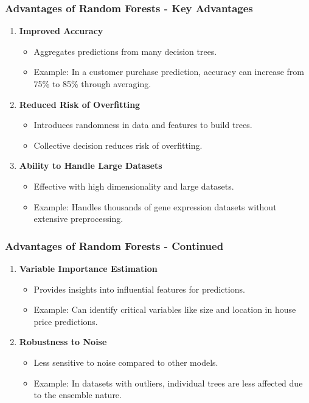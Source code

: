 \documentclass[aspectratio=169]{beamer}
\begin{document}
\begin{frame}[fragile]
    \frametitle{Advantages of Random Forests - Key Advantages}
    \begin{enumerate}
        \item \textbf{Improved Accuracy}
        \begin{itemize}
            \item Aggregates predictions from many decision trees.
            \item Example: In a customer purchase prediction, accuracy can increase from 75\% to 85\% through averaging.
        \end{itemize}
        
        \item \textbf{Reduced Risk of Overfitting}
        \begin{itemize}
            \item Introduces randomness in data and features to build trees.
            \item Collective decision reduces risk of overfitting.
        \end{itemize}
        
        \item \textbf{Ability to Handle Large Datasets}
        \begin{itemize}
            \item Effective with high dimensionality and large datasets.
            \item Example: Handles thousands of gene expression datasets without extensive preprocessing.
        \end{itemize}
    \end{enumerate}
\end{frame}

\begin{frame}[fragile]
    \frametitle{Advantages of Random Forests - Continued}
    \begin{enumerate}[resume]
        \item \textbf{Variable Importance Estimation}
        \begin{itemize}
            \item Provides insights into influential features for predictions.
            \item Example: Can identify critical variables like size and location in house price predictions.
        \end{itemize}
        
        \item \textbf{Robustness to Noise}
        \begin{itemize}
            \item Less sensitive to noise compared to other models.
            \item Example: In datasets with outliers, individual trees are less affected due to the ensemble nature.
        \end{itemize}
    \end{enumerate}
\end{frame}
\end{document}
